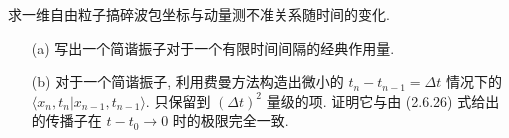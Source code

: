 \documentclass{assignment}
\begin{document}
\begin{prob}
    求一维自由粒子搞碎波包坐标与动量测不准关系随时间的变化.
\end{prob}
\begin{sol}
    
\end{sol}

\begin{prob}[2.34]
    \begin{itemize}
        \item[(a)] 写出一个简谐振子对于一个有限时间间隔的经典作用量.
        \item[(b)] 对于一个简谐振子, 利用费曼方法构造出微小的 $t_n-t_{n-1}=\Delta t$ 情况下的 $\langle x_n,t_n\vert x_{n-1},t_{n-1}\rangle$. 只保留到 $(\Delta t)^2$ 量级的项. 证明它与由 (2.6.26) 式给出的传播子在 $t-t_0\rightarrow 0$ 时的极限完全一致.
    \end{itemize}
\end{prob}
\begin{sol}
    
\end{sol}
\end{document}
